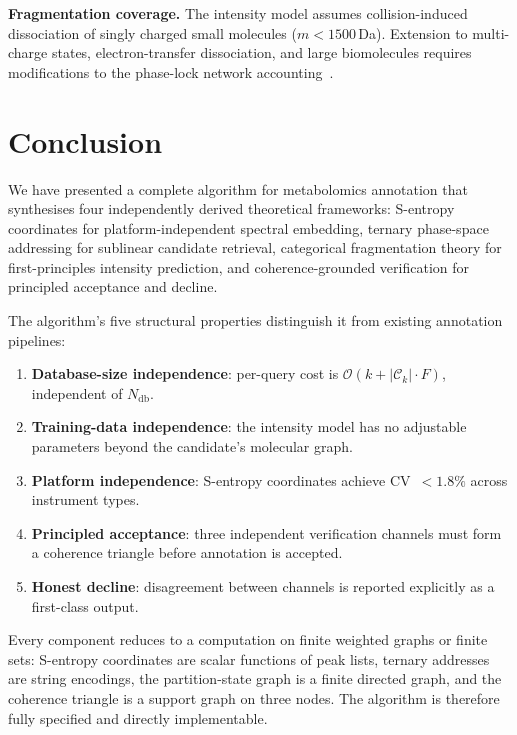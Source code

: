 \documentclass[twocolumn,10pt,a4paper]{article}
\theoremstyle{thmstyle}
\theoremstyle{definition}
\theoremstyle{remark}
\newcommand{\calC}{\mathcal{C}}
\begin{document}
\textbf{Fragmentation coverage.} The intensity model assumes
collision-induced dissociation of singly charged small molecules
($m < 1500$\,Da). Extension to multi-charge states, electron-transfer
dissociation, and large biomolecules requires modifications to the
phase-lock network accounting~\citep{sachikonye2024categorical}.


\section{Conclusion}
\label{sec:conclusion}

We have presented a complete algorithm for metabolomics annotation that
synthesises four independently derived theoretical frameworks:
S-entropy coordinates for platform-independent spectral embedding,
ternary phase-space addressing for sublinear candidate retrieval,
categorical fragmentation theory for first-principles intensity
prediction, and coherence-grounded verification for principled
acceptance and decline.

The algorithm's five structural properties distinguish it from existing
annotation pipelines:

\begin{enumerate}[nosep,label=(\roman*)]
\item \textbf{Database-size independence}: per-query cost is
  $\mathcal{O}(k + |\calC_k| \cdot F)$, independent of
  $N_{\mathrm{db}}$.
\item \textbf{Training-data independence}: the intensity model has no
  adjustable parameters beyond the candidate's molecular graph.
\item \textbf{Platform independence}: S-entropy coordinates achieve
  CV~$< 1.8\%$ across instrument types.
\item \textbf{Principled acceptance}: three independent verification
  channels must form a coherence triangle before annotation is accepted.
\item \textbf{Honest decline}: disagreement between channels is
  reported explicitly as a first-class output.
\end{enumerate}

Every component reduces to a computation on finite weighted graphs or
finite sets: S-entropy coordinates are scalar functions of peak lists,
ternary addresses are string encodings, the partition-state graph is
a finite directed graph, and the coherence triangle is a support graph
on three nodes. The algorithm is therefore fully specified and directly
implementable.
\end{document}
